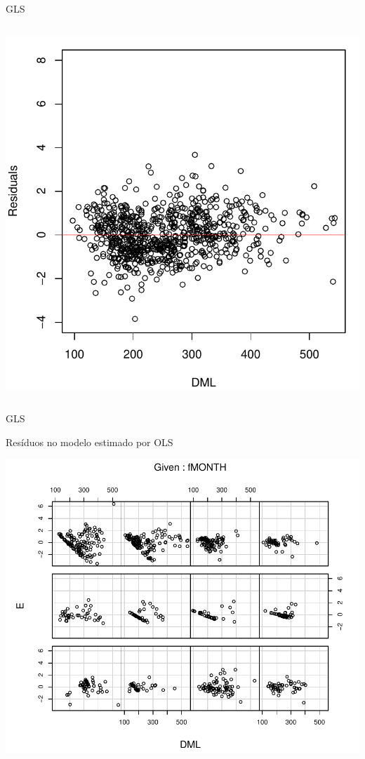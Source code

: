 \documentclass{beamer}\usepackage[]{graphicx}\usepackage[]{color}
\newenvironment{knitrout}{}{} %
\renewenvironment{knitrout}{\setlength{\topsep}{0mm}}{}
\begin{document}
\begin{frame}[fragile]{GLS}
\begin{columns}[c]
\begin{knitrout}
\includegraphics[width=0.7\linewidth]{figure/glsp4-2} 

\end{knitrout}

\end{columns}

\end{frame}


\begin{frame}[fragile]{GLS}

 Resíduos no modelo estimado por OLS

\begin{knitrout}
\color{fgcolor}
\includegraphics[width=0.7\linewidth]{figure/glsp5-1} 

\end{knitrout}


\end{frame}
\end{document}
